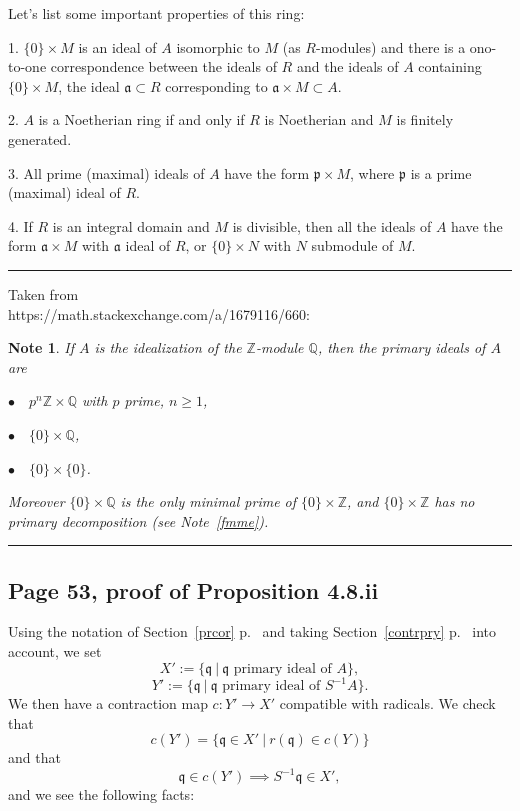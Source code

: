\documentclass[parskip=half,fontsize=12pt]{scrartcl}%
\newcommand{\mf}{\mathfrak}
\newcommand{\ppp}{\mf p}
\newcommand{\qqq}{\mf q}
\newtheorem{note}[thm]{Note}
\begin{document}
Let's list some important properties of this ring:

1. $\{0\}\times M$ is an ideal of $A$ isomorphic to $M$ (as $R$-modules) and there is a ono-to-one correspondence between the ideals of $R$ and the ideals of $A$ containing $\{0\}\times M$, the ideal $\mf a\subset R$ corresponding to $\mf a\times M\subset A$.

2. $A$ is a Noetherian ring if and only if $R$ is Noetherian and $M$ is finitely generated.

3. All prime (maximal) ideals of $A$ have the form $\ppp\times M$, where $\ppp$ is a prime (maximal) ideal of $R$.

4. If $R$ is an integral domain and $M$ is divisible, then all the ideals of $A$ have the form $\mf a\times M$ with $\mf a$ ideal of $R$, or $\{0\}\times N$ with $N$ submodule of $M$.\bigskip\bigskip

\hrule\bigskip%

Taken from\\ https://math.stackexchange.com/a/1679116/660:\bigskip

\begin{note}%
If $A$ is the idealization of the $\mathbb Z$-module $\mathbb Q$, then the primary ideals of $A$ are  

$\bullet\quad p^n\mathbb Z\times\mathbb Q$ with $p$ prime, $n\ge1$, 

$\bullet\quad\{0\}\times\mathbb Q$,

$\bullet\quad\{0\}\times\{0\}$. 

Moreover $\{0\}\times\mathbb Q$ is the only minimal prime of $\{0\}\times\mathbb Z$, and $\{0\}\times\mathbb Z$ has no primary decomposition (see Note~\ref{fmme}).
\end{note}\bigskip

\hrule\bigskip

\subsection{Page 53, proof of Proposition 4.8.ii}\label{prycor}%

Using the notation of Section~\ref{prcor} p.~\pageref{prcor} and taking Section~\ref{contrpry} p.~\pageref{contrpry} into account, we set 
$$
X':=\{\qqq\ |\ \qqq\text{ primary ideal of }A\},
$$ 
$$
Y':=\{\qqq\ |\ \qqq\text{ primary ideal of }S^{-1}A\}.
$$ 
We then have a contraction map $c:Y'\to X'$ compatible with radicals. We check that  
$$
c(Y')=\{\qqq\in X'\ |\ r(\qqq)\in c(Y)\}
$$ 
and that 
$$
\qqq\in c(Y')\implies S^{-1}\qqq\in X',
$$ 
and we see the following facts: 
\end{document}
